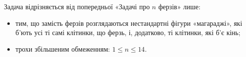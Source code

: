 ﻿Задача відрізняється від попередньої «Задачі про $n$ ферзів» лише:
\begin{itemize}
\item
тим, що замість ферзів розглядаються нестандартні фігури «магараджі», які б'ють усі ті самі клітинки, що ферзь, і, додатково, ті клітинки, які б'є кінь;
\item
трохи збільшеним обмеженням: $1\leqslant n\leqslant 14$.
\end{itemize}


\Examples
\begin{example}
\end{example}
